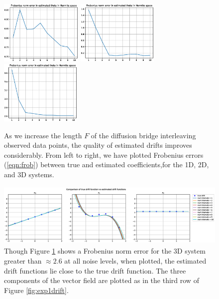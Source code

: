 \documentclass{article}
\begin{document}
\begin{figure}[th]
\begin{center}
\includegraphics[height=1.2in]{../1dcode/varying_subintervals/plots/tp_51/hermite.eps}
\includegraphics[height=1.2in]{../2dcode/varying_subintervals/plots/tp_51/hermite.eps}
\includegraphics[height=1.2in]{../3ddampedduffing/varying_subintervals/plots/tp_51/hermite.eps}
\end{center}
\caption{As we increase the length $F$ of the diffusion bridge interleaving observed data points, the quality of estimated drifts improves considerably.  From left to right, we have plotted Frobenius errors (\ref{eqn:frob}) between true and estimated coefficients,for the 1D, 2D, and 3D systems.}
\label{fig:exp4hermite}
\end{figure}

\begin{figure}[th]
\begin{center}
\includegraphics[height=1.2in]{../3ddampedduffing/varying_subintervals/plots/tp_51/drift_comparison.eps}
\end{center}
\caption{Though Figure \ref{fig:exp4hermite} shows a Frobenius norm error for the 3D system greater than $\approx 2.6$ at all noise levels, when plotted, the estimated drift functions lie close to the true drift function. The three components of the vector field are plotted as in the third row of Figure \ref{fig:exp1drift}.}
\label{fig:exp4drift}
\end{figure}
\end{document}
